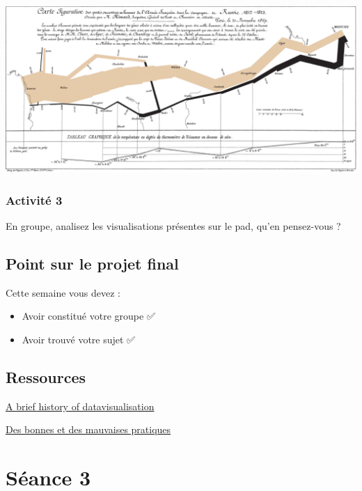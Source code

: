 \documentclass[
  letterpaper,
  DIV=11,
  numbers=noendperiod]{scrreprt}
\begin{document}
\begin{enumerate}
  \includegraphics{./images/Minard.png}
\end{enumerate}

\hypertarget{activituxe9-3}{%
\subsection{Activité 3}\label{activituxe9-3}}

En groupe, analisez les visualisations présentes sur le pad, qu'en
pensez-vous ?

\hypertarget{point-sur-le-projet-final}{%
\section{Point sur le projet final}\label{point-sur-le-projet-final}}

Cette semaine vous devez :

\begin{itemize}
\item
  Avoir constitué votre groupe ✅
\item
  Avoir trouvé votre sujet ✅
\end{itemize}

\hypertarget{ressources}{%
\section{Ressources}\label{ressources}}

\href{https://www.youtube.com/watch?v=N00g9Q9stBo}{A brief history of
datavisualisation}

\href{https://www.datavis.ca/gallery/}{Des bonnes et des mauvaises
pratiques}


\hypertarget{suxe9ance-3}{%
\chapter{Séance 3}\label{suxe9ance-3}}
\end{document}
